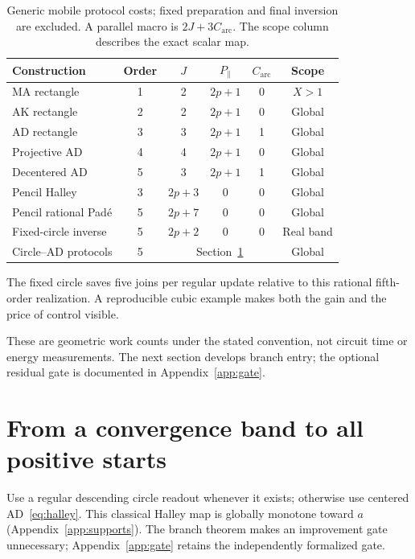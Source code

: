 \documentclass[11pt,a4paper]{article}
\begin{document}
\begin{table}[H]\centering\small
\caption{Generic mobile protocol costs; fixed preparation and final inversion are excluded. A parallel macro is $2J+3C_{\mathrm{arc}}$. The scope column describes the exact scalar map.}
\begin{tabularx}{\linewidth}{@{}Xccccc@{}}\toprule
Construction & Order & $J$ & $P_{\parallel}$ & $C_{\mathrm{arc}}$ & Scope\\\midrule
MA rectangle & 1 & 2 & $2p+1$ & 0 & $X>1$\\
AK rectangle & 2 & 2 & $2p+1$ & 0 & Global\\
AD rectangle & 3 & 3 & $2p+1$ & 1 & Global\\
Projective AD & 4 & 4 & $2p+1$ & 0 & Global\\
Decentered AD & 5 & 3 & $2p+1$ & 1 & Global\\
Pencil Halley & 3 & $2p+3$ & 0 & 0 & Global\\
Pencil rational Pad\'e & 5 & $2p+7$ & 0 & 0 & Global\\
Fixed-circle inverse & 5 & $2p+2$ & 0 & 0 & Real band\\
Circle--AD protocols & 5 & \multicolumn{3}{c}{Section~\ref{sec:safeguard}} & Global\\\bottomrule
\end{tabularx}
\end{table}
The fixed circle saves five joins per regular update relative to this rational fifth-order realization. A reproducible cubic example makes both the gain and the price of control visible.
\begin{table}[H]\centering\small
\caption{Steps / mobile joins to obtain $|s/a-1|\le10^{-d}$ from $p=3,X=2,s_0=3/4$, computed at 250 digits. The last two rows include the 12 joins for initial binary residual caching in their totals; every circle trial here is regular and accepted.}
\end{table}
These are geometric work counts under the stated convention, not circuit time or energy measurements. The next section develops branch entry; the optional residual gate is documented in Appendix~\ref{app:gate}.


\clearpage
\section{From a convergence band to all positive starts}\label{sec:safeguard}
Use a regular descending circle readout whenever it exists; otherwise use centered AD~\eqref{eq:halley}. This classical Halley map is globally monotone toward $a$ (Appendix~\ref{app:supports}). The branch theorem makes an improvement gate unnecessary; Appendix~\ref{app:gate} retains the independently formalized gate.
\end{document}
